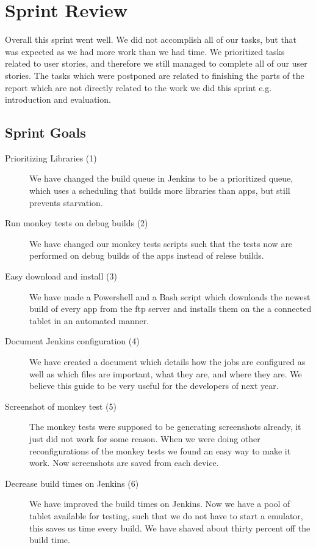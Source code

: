 \chapter{Sprint Review}\label{chap:sprint4_end}
Overall this sprint went well. We did not accomplish all of our tasks, but that was expected as we had more work than we had time. We prioritized tasks related to user stories, and therefore we still managed to complete all of our user stories. The tasks which were postponed are related to finishing the parts of the report which are not directly related to the work we did this sprint e.g. introduction and evaluation. 
\section{Sprint Goals}\label{sec:s4_goals}
\begin{description}
    \item[Prioritizing Libraries (1)] We have changed the build queue in Jenkins to be a prioritized queue, which uses a scheduling that builds more libraries than apps, but still prevents starvation.
    \item[Run monkey tests on debug builds (2)] We have changed our monkey tests scripts such that the tests now are performed on debug builds of the apps instead of relese builds. 
    \item[Easy download and install (3)] We have made a Powershell and a Bash script which downloads the newest build of every app from the ftp server and installs them on the a connected tablet in an automated manner. 
    \item[Document Jenkins configuration (4)] We have created a document which details how the jobs are configured as well as which files are important, what they are, and where they are. We believe this guide to be very useful for the developers of next year.
    \item[Screenshot of monkey test (5)] The monkey tests were supposed to be generating screenshots already, it just did not work for some reason. When we were doing other reconfigurations of the monkey tests we found an easy way to make it work. Now screenshots are saved from each device.
    \item[Decrease build times on Jenkins (6)] We have improved the build times on Jenkins. Now we have a pool of tablet available for testing, such that we do not have to start a emulator, this saves us time every build. We have shaved about thirty percent off the build time.
\end{description}
